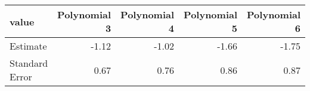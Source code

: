 \begin{tabular}{lrrrr}
  \hline
value & Polynomial 3 & Polynomial 4 & Polynomial 5 & Polynomial 6 \\ 
  \hline
Estimate & -1.12 & -1.02 & -1.66 & -1.75 \\ 
  Standard Error & 0.67 & 0.76 & 0.86 & 0.87 \\ 
   \hline
\end{tabular}
